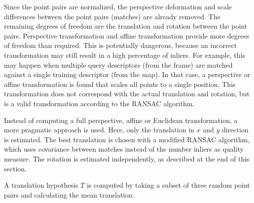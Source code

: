 Since the point pairs are normalized,
the perspective deformation and scale differences between the point pairs (matches) are already removed.
The remaining degrees of freedom are the translation and rotation between the point pairs. 
Perspective transformation and affine transformation provide more degrees of freedom than required.
This is potentially dangerous, because an incorrect transformation may still result in a high percentage of inliers.
For example, this may happen when multiple query descriptors (from the frame) are matched against a single training descriptor (from the map).
In that case, a perspective or affine transformation is found that scales all points to a single position.
This transformation does not correspond with the actual translation and rotation, but is a valid transformation according to the RANSAC algorithm.

Instead of computing a full perspective, affine or Euclidean transformation, a more pragmatic approach is used.
Here, only the translation in $x$ and $y$ direction is estimated.
The best translation is chosen with a modified RANSAC algorithm, which uses covariance between matches instead of the number inliers as quality measure.
The rotation is estimated independently, as described at the end of this section.

A translation hypothesis $T$ is computed by taking a subset of three random point pairs and calculating the mean translation:

